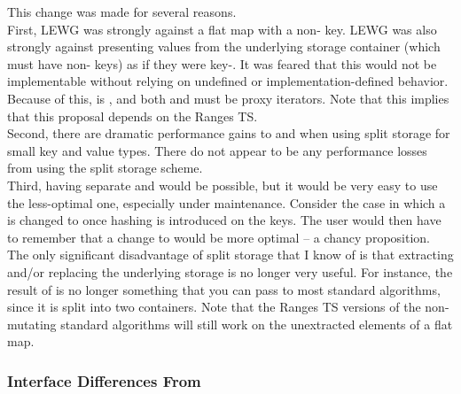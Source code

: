 This change was made for several reasons.\\

First, LEWG was strongly against a flat map  with a
non- key.  LEWG was also strongly against presenting values from
the underlying storage container (which must have non- keys) as if
they were key-.  It was feared that this would not be
implementable without relying on undefined or implementation-defined behavior.
Because of this,  is , and both
 and  must be proxy iterators.  Note that
this implies that this proposal depends on the Ranges TS.\\

Second, there are dramatic performance gains to  and
 when using split storage for small key and value types.  There
do not appear to be any performance losses from using the split storage scheme.\\

Third, having separate  and  would be
possible, but it would be very easy to use the less-optimal one, especially
under maintenance.  Consider the case in which a  is changed to  once hashing is introduced on
the keys.  The user would then have to remember that a change to
 would be more optimal -- a chancy proposition.\\

The only significant disadvantage of split storage that I know of is that
extracting and/or replacing the underlying storage is no longer very useful.
For instance, the result of  is no longer something that you
can pass to most standard algorithms, since it is split into two containers.
Note that the Ranges TS versions of the non-mutating standard algorithms will
still work on the unextracted elements of a flat map.

\subsubsection{Interface Differences From }

